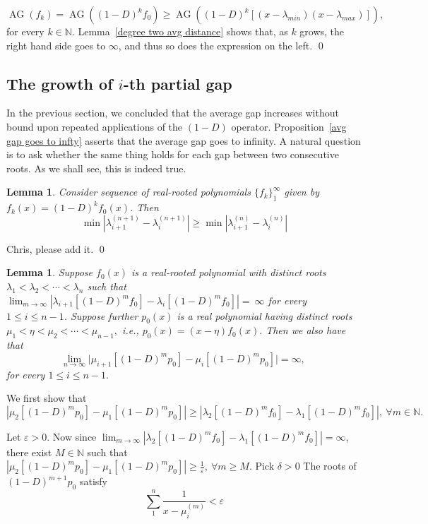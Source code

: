 \documentclass[11pt]{article}
\DeclareMathOperator{\AG}{AG}
\newtheorem{lemma}[theorem]{Lemma}
\begin{document}
\[\AG(f_k)= \AG((1-D)^kf_0)\geq\AG((1-D)^k [(x-\lambda_{min})(x-\lambda_{max})]),\]
for every $k\in\mathbb{N}$. Lemma~\ref{degree two avg distance} shows that, as $k$ grows, the right hand side goes to $\infty$, and thus so does the expression on the left. \qed

\subsection{The growth of $i$-th partial gap}
In the previous section, we concluded that the average gap increases without bound upon repeated applications of the $(1-D)$ operator. Proposition~\ref{avg gap goes to infty} asserts that the average gap goes to infinity. A natural question is to ask whether the same thing holds for each gap between two consecutive roots. As we shall see, this is indeed true.

\begin{lemma}
\label{minimal gap increases}
 Consider sequence of real-rooted polynomials $\{f_k\}_1^\infty$ given by $f_k(x) = (1-D)^k f_0(x)$. Then
 \[\min |\lambda^{(n+1)}_{i+1} - \lambda^{(n+1)}_i | \geq \min |\lambda^{(n)}_{i+1} - \lambda^{(n)}_i |\]
\end{lemma}
\proof Chris, please add it.
\qed

\begin{lemma}
Suppose $f_0(x)$ is a real-rooted polynomial with distinct roots $\lambda_1 < \lambda_2 < \cdots <\lambda_{n}$ such that $\lim_{m\to\infty} |\lambda_{i+1}[(1-D)^m f_0] - \lambda_{i}[(1-D)^m f_0]| =~\infty$ for every $ 1\leq i \leq n-1$. Suppose further $p_0(x)$ is a real polynomial having distinct roots $\mu_1 < \eta <\mu_2 < \cdots < \mu_{n-1},$ i.e., $p_0(x) = (x-\eta)f_0(x).$ Then we also have that
\[\lim_{n\to\infty} |\mu_{i+1}[(1-D)^m p_0] - \mu_{i}[(1-D)^m p_0]\big|=\infty,~\]
for every $1\leq i \leq n-1.$

\end{lemma}
\proof
We first show that 
\[|\mu_{2}[(1-D)^m p_0] - \mu_{1}[(1-D)^m p_0]| \geq |\lambda_{2}[(1-D)^m f_0] - \lambda_{1}[(1-D)^m f_0]|,~\forall m\in\mathbb{N}.\]


Let $\varepsilon > 0$. Now since $\lim_{m\to\infty} |\lambda_{2}[(1-D)^m f_0] - \lambda_{1}[(1-D)^m f_0]| = \infty$, there exist $M\in\mathbb{N}$ such that $|\mu_{2}[(1-D)^m p_0] - \mu_{1}[(1-D)^m p_0]| \geq \frac{1}{\varepsilon},~\forall m\geq M$. Pick $\delta > 0$ The roots of $(1-D)^{m+1} p_0$ satisfy
\[\sum_1^n \frac{1}{x-\mu^{(m)}_i} < \varepsilon \]
\end{document}
